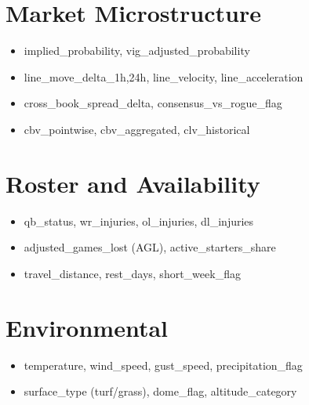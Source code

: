 \documentclass[12pt]{report}  %
\numberwithin{equation}{section}
\theoremstyle{plain}
\theoremstyle{definition}
\theoremstyle{remark}
\begin{document}
\section{Market Microstructure}
\begin{itemize}
  \item implied\_probability, vig\_adjusted\_probability
  \item line\_move\_delta\_{1h,24h}, line\_velocity, line\_acceleration
  \item cross\_book\_spread\_delta, consensus\_vs\_rogue\_flag
  \item cbv\_pointwise, cbv\_aggregated, clv\_historical
\end{itemize}

\section{Roster and Availability}
\begin{itemize}
  \item qb\_status, wr\_injuries, ol\_injuries, dl\_injuries
  \item adjusted\_games\_lost (AGL), active\_starters\_share
  \item travel\_distance, rest\_days, short\_week\_flag
\end{itemize}

\section{Environmental}
\begin{itemize}
  \item temperature, wind\_speed, gust\_speed, precipitation\_flag
  \item surface\_type (turf/grass), dome\_flag, altitude\_category
\end{itemize}
\end{document}
